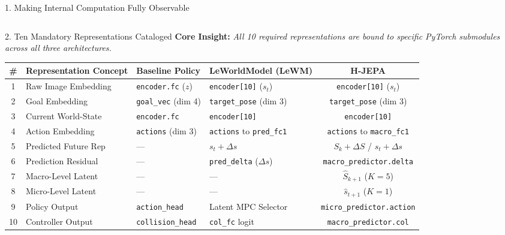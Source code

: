 \documentclass[aspectratio=169, 10pt]{beamer}
\begin{document}
\begin{frame}{1. Making Internal Computation Fully Observable}
\begin{columns}[T]
\begin{column}{0.42\textwidth}
\begin{center}
      \end{center}
    \end{column}
  \end{columns}
\end{frame}

\begin{frame}{2. Ten Mandatory Representations Cataloged}
  \textbf{Core Insight:} \textit{All 10 required representations are bound to specific PyTorch submodules across all three architectures.}

  \vspace{0.2cm}
  \begin{center}
    \footnotesize
    \begin{tabular}{clllc}
      \toprule
      \textbf{\#} & \textbf{Representation Concept} & \textbf{Baseline Policy} & \textbf{LeWorldModel (LeWM)} & \textbf{H-JEPA} \\
      \midrule
      1 & Raw Image Embedding & \texttt{encoder.fc} ($z$) & \texttt{encoder[10]} ($s_t$) & \texttt{encoder[10]} ($s_t$) \\
      2 & Goal Embedding & \texttt{goal\_vec} (dim 4) & \texttt{target\_pose} (dim 3) & \texttt{target\_pose} (dim 3) \\
      3 & Current World-State & \texttt{encoder.fc} & \texttt{encoder[10]} & \texttt{encoder[10]} \\
      4 & Action Embedding & \texttt{actions} (dim 3) & \texttt{actions} to \texttt{pred\_fc1} & \texttt{actions} to \texttt{macro\_fc1} \\
      5 & Predicted Future Rep & --- & $s_t + \Delta s$ & $S_k + \Delta S$ / $s_t + \Delta s$ \\
      6 & Prediction Residual & --- & \texttt{pred\_delta} ($\Delta s$) & \texttt{macro\_predictor.delta} \\
      7 & Macro-Level Latent & --- & --- & $\hat{S}_{k+1}$ ($K=5$) \\
      8 & Micro-Level Latent & --- & --- & $\hat{s}_{t+1}$ ($K=1$) \\
      9 & Policy Output & \texttt{action\_head} & Latent MPC Selector & \texttt{micro\_predictor.action} \\
      10 & Controller Output & \texttt{collision\_head} & \texttt{col\_fc} logit & \texttt{macro\_predictor.col} \\
      \bottomrule
    \end{tabular}
  \end{center}


\end{frame}
\end{document}
